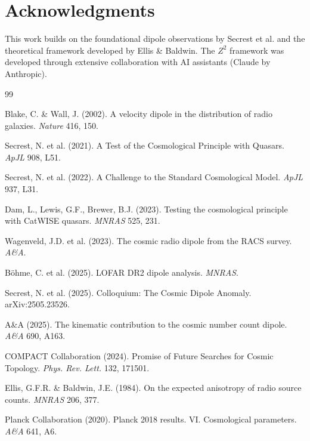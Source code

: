\documentclass[12pt,a4paper]{article}
\begin{document}
\section*{Acknowledgments}

This work builds on the foundational dipole observations by Secrest et al. and the theoretical framework developed by Ellis \& Baldwin. The $Z^2$ framework was developed through extensive collaboration with AI assistants (Claude by Anthropic).

\begin{thebibliography}{99}

Blake, C. \& Wall, J. (2002). A velocity dipole in the distribution of radio galaxies. \textit{Nature} 416, 150.

Secrest, N. et al. (2021). A Test of the Cosmological Principle with Quasars. \textit{ApJL} 908, L51.

Secrest, N. et al. (2022). A Challenge to the Standard Cosmological Model. \textit{ApJL} 937, L31.

Dam, L., Lewis, G.F., Brewer, B.J. (2023). Testing the cosmological principle with CatWISE quasars. \textit{MNRAS} 525, 231.

Wagenveld, J.D. et al. (2023). The cosmic radio dipole from the RACS survey. \textit{A\&A}.

B\"ohme, C. et al. (2025). LOFAR DR2 dipole analysis. \textit{MNRAS}.

Secrest, N. et al. (2025). Colloquium: The Cosmic Dipole Anomaly. arXiv:2505.23526.

A\&A (2025). The kinematic contribution to the cosmic number count dipole. \textit{A\&A} 690, A163.

COMPACT Collaboration (2024). Promise of Future Searches for Cosmic Topology. \textit{Phys. Rev. Lett.} 132, 171501.

Ellis, G.F.R. \& Baldwin, J.E. (1984). On the expected anisotropy of radio source counts. \textit{MNRAS} 206, 377.

Planck Collaboration (2020). Planck 2018 results. VI. Cosmological parameters. \textit{A\&A} 641, A6.

\end{thebibliography}
\end{document}
